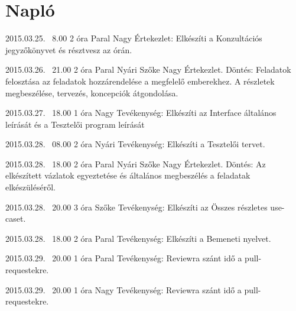 %
\section{Napló}

\begin{naplo}
	
	\bejegyzes
	{2015.03.25. ~8.00}
	{2 óra}
    {Paral Nagy} 
	{Értekezlet: Elkészíti a Konzultációs jegyzőkönyvet és résztvesz az órán.\newline } 
	
	\bejegyzes
	{2015.03.26. ~21.00}
	{2 óra}
	{Paral \newline Nyári \newline Szőke \newline Nagy} 
	{Értekezlet.
		Döntés: Feladatok felosztása az feladatok hozzárendelése a megfelelő emberekhez. A részletek megbeszélése, tervezés, koncepciók átgondolása.\newline } 

	\bejegyzes
	{2015.03.27. ~18.00}
	{1 óra}
	{Nagy} 
	{Tevékenység: Elkészíti az Interface általános leírását és a Tesztelői program leírását\newline } 			
	
	\bejegyzes
	{2015.03.28. ~08.00}
	{2 óra}
	{Nyári} 
	{Tevékenység: Elkészíti a Tesztelői tervet.\newline }
	
	\bejegyzes
	{2015.03.28. ~18.00}
	{2 óra}
	{Paral \newline Nyári \newline Szőke \newline Nagy} 
	{Értekezlet.
		Döntés: Az elkészített vázlatok egyeztetése és általános megbeszélés a feladatak elkészüléséről.\newline } 

	\bejegyzes
	{2015.03.28. ~20.00}
	{3 óra}
	{Szőke} 
	{Tevékenység: Elkészíti az Összes részletes use-caset.\newline }	

    \bejegyzes
    {2015.03.28. ~18.00}
    {2 óra}
    {Paral} 
    {Tevékenység: Elkészíti a Bemeneti nyelvet.\newline } 

    \bejegyzes
    {2015.03.29. ~20.00}
    {1 óra}
    {Paral} 
    {Tevékenység: Reviewra szánt idő a pull-requestekre.\newline } 

    \bejegyzes
    {2015.03.29. ~20.00}
    {1 óra}
    {Nagy} 
    {Tevékenység: Reviewra szánt idő a pull-requestekre.\newline } 


\end{naplo}
